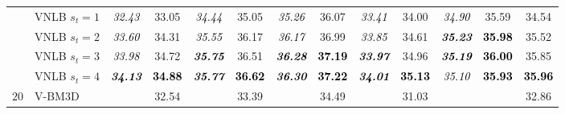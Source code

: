 \documentclass[10pt, a4paper]{article}
\newcommand{\bsic}[1]{\textcolor{black}{\textit{#1}}}
\newcommand{\Bsic}[1]{\textcolor{black}{\textbf{\textit{#1}}}}
\newcommand{\Best}[1]{\textbf{\textcolor{black}{#1}}}
\begin{document}
\begin{table}[htp!]
\begin{center}
{\begin{tabular}{ c | l |c c | c c | c c | c c | c c | c}
			                      & VNLB   $s_t = 1$     & \bsic{32.43} &       33.05  & \bsic{34.44} &       35.05  & \bsic{35.26} &       36.07  & \bsic{33.41} &       34.00  & \bsic{34.90} &       35.59  &       34.54  \\
			                      & VNLB   $s_t = 2$     & \bsic{33.60} &       34.31  & \bsic{35.55} &       36.17  & \bsic{36.17} &       36.99  & \bsic{33.85} &       34.61  & \Bsic{35.23} & \Best{35.98} &       35.52  \\
			                      & VNLB   $s_t = 3$     & \bsic{33.98} &       34.72  & \Bsic{35.75} &       36.51  & \Bsic{36.28} & \Best{37.19} & \Bsic{33.97} &       34.96  & \Bsic{35.19} & \Best{36.00} &       35.85  \\
			                      & VNLB   $s_t = 4$     & \Bsic{34.13} & \Best{34.88} & \Bsic{35.77} & \Best{36.62} & \Bsic{36.30} & \Best{37.22} & \Bsic{34.01} & \Best{35.13} & \bsic{35.10} & \Best{35.93} & \Best{35.96} \\\hline
			\multirow{1}{*}{$20$}
			                      & V-BM3D               & \bsic{     } &       32.54  & \bsic{     } &       33.39  & \bsic{     } &       34.49  & \bsic{     } &       31.03  & \bsic{     } &              &       32.86  \\

\end{tabular}}
\end{center}
\end{table}
\end{document}
